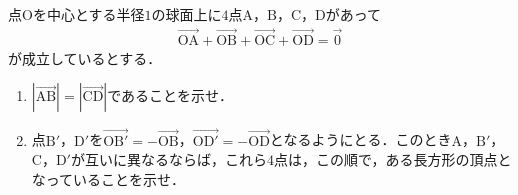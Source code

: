 \documentclass[../../main.tex]{subfiles}
\begin{document}
点$\mathrm{O}$を中心とする半径$1$の球面上に$4$点$\mathrm{A}$，$\mathrm{B}$，$\mathrm{C}$，$\mathrm{D}$があって
\begin{align*}
  \overrightarrow{\mathrm{OA}}+ \overrightarrow{\mathrm{OB}}+ \overrightarrow{\mathrm{OC}}+ \overrightarrow{\mathrm{OD}}=\vec{0}
\end{align*}
が成立しているとする．
\begin{enumerate}
  \item $|\overrightarrow{\mathrm{AB}}|=|\overrightarrow{\mathrm{CD}}|$であることを示せ．
  \item 点$\mathrm{B'}$，$\mathrm{D'}$を$\overrightarrow{\mathrm{OB'}}=-\overrightarrow{\mathrm{OB}}$，$\overrightarrow{\mathrm{OD'}}=-\overrightarrow{\mathrm{OD}}$となるようにとる．このとき$\mathrm{A}$，$\mathrm{B}'$，$\mathrm{C}$，$\mathrm{D}'$が互いに異なるならば，これら$4$点は，この順で，ある長方形の頂点となっていることを示せ．
\end{enumerate}
\end{document}
